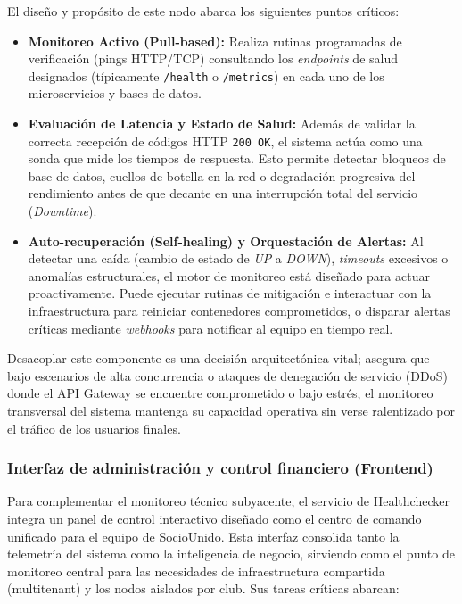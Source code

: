 El diseño y propósito de este nodo abarca los siguientes puntos críticos:
\begin{itemize}
    \item \textbf{Monitoreo Activo (Pull-based):} Realiza rutinas programadas de verificación (pings HTTP/TCP) consultando los \textit{endpoints} de salud designados (típicamente \texttt{/health} o \texttt{/metrics}) en cada uno de los microservicios y bases de datos.
    \item \textbf{Evaluación de Latencia y Estado de Salud:} Además de validar la correcta recepción de códigos HTTP \texttt{200 OK}, el sistema actúa como una sonda que mide los tiempos de respuesta. Esto permite detectar bloqueos de base de datos, cuellos de botella en la red o degradación progresiva del rendimiento antes de que decante en una interrupción total del servicio (\textit{Downtime}).
    \item \textbf{Auto-recuperación (Self-healing) y Orquestación de Alertas:} Al detectar una caída (cambio de estado de \textit{UP} a \textit{DOWN}), \textit{timeouts} excesivos o anomalías estructurales, el motor de monitoreo está diseñado para actuar proactivamente. Puede ejecutar rutinas de mitigación e interactuar con la infraestructura para reiniciar contenedores comprometidos, o disparar alertas críticas mediante \textit{webhooks} para notificar al equipo en tiempo real.
\end{itemize}

Desacoplar este componente es una decisión arquitectónica vital; asegura que bajo escenarios de alta concurrencia o ataques de denegación de servicio (DDoS) donde el API Gateway se encuentre comprometido o bajo estrés, el monitoreo transversal del sistema mantenga su capacidad operativa sin verse ralentizado por el tráfico de los usuarios finales.

\subsubsection*{Interfaz de administración y control financiero (Frontend)}

Para complementar el monitoreo técnico subyacente, el servicio de Healthchecker integra un panel de control interactivo diseñado como el centro de comando unificado para el equipo de SocioUnido. Esta interfaz consolida tanto la telemetría del sistema como la inteligencia de negocio, sirviendo como el punto de monitoreo central para las necesidades de infraestructura compartida (multitenant) y los nodos aislados por club. Sus tareas críticas abarcan:

